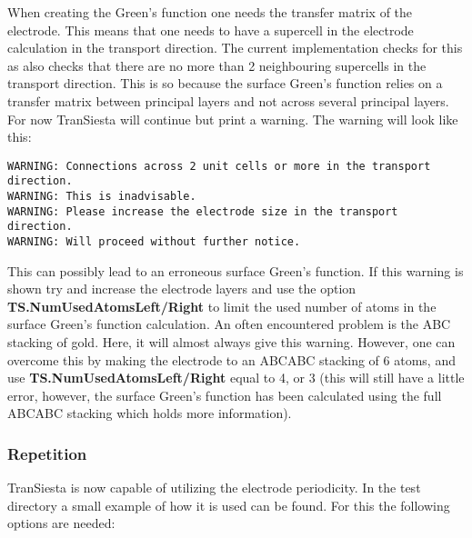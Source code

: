 \documentclass[11pt]{article}
\begin{document}
When creating the Green's function one needs the transfer matrix of the 
electrode. This means that one needs to have a supercell in the 
electrode calculation in the transport direction. The current 
implementation checks for this as also checks that there are no more
than 2 neighbouring supercells in the transport direction. This is
so because the surface Green's function relies on a transfer matrix
between principal layers and not across several principal layers.
For now {\sc TranSiesta} will continue but print a warning.
The warning will look like this:
\begin{verbatim}
WARNING: Connections across 2 unit cells or more in the transport direction.
WARNING: This is inadvisable.
WARNING: Please increase the electrode size in the transport direction.
WARNING: Will proceed without further notice.
\end{verbatim}
This can possibly lead to an erroneous surface Green's function. If this
warning is shown try and increase the electrode layers and use the option
{\bf TS.NumUsedAtomsLeft/Right} to limit the used number of atoms in the
surface Green's function calculation. An often encountered problem is the ABC stacking of
gold. Here, it will almost always give this warning. However, one can overcome this by
making the electrode to an ABCABC stacking of 6 atoms, and use {\bf
    TS.NumUsedAtomsLeft/Right} equal to 4, or 3 (this will still have a little error,
however, the surface Green's function has been calculated using the full ABCABC stacking which
holds more information).

\subsubsection{Repetition}

{\sc TranSiesta} is now capable of utilizing the electrode periodicity. In the test
directory a small example of how it is used can be found. For this the following options
are needed:
\end{document}
